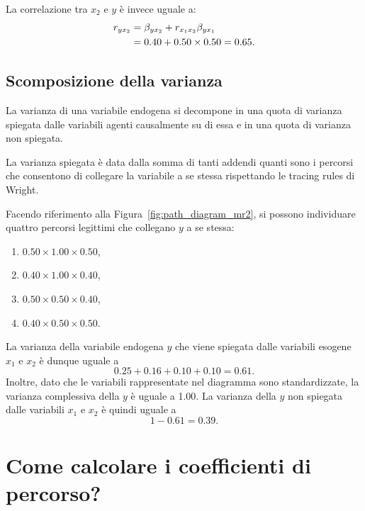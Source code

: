 La correlazione tra $x_2$ e $y$ è invece uguale a:
\begin{align}
  r_{yx_2} &=\beta_{yx_2} + r_{x_1x_2} \beta_{yx_1}\notag\\
  &= 0.40 + 0.50 \times 0.50 = 0.65.\notag
\end{align}


\subsection{Scomposizione della varianza}

La varianza di una variabile endogena si decompone in una quota
  di varianza spiegata dalle variabili agenti causalmente su di essa e
  in una quota di varianza non spiegata. 
  
\begin{defn}
  La varianza spiegata è data dalla somma di tanti addendi
  quanti sono i percorsi che consentono di collegare la
    variabile a se 
  stessa rispettando le tracing rules di Wright.  
\end{defn}

Facendo riferimento alla Figura~\ref{fig:path_diagram_mr2}, si possono
individuare quattro percorsi legittimi che collegano $y$ a se stessa:

\bigskip

  \begin{enumerate}
  \item $0.50 \times 1.00 \times 0.50$,
\item $0.40 \times 1.00 \times 0.40$,
\item $0.50 \times 0.50 \times 0.40$,
\item $0.40 \times 0.50 \times 0.50$.
  \end{enumerate}

\bigskip
\noindent
La varianza della variabile endogena $y$ che viene spiegata dalle
variabili esogene $x_1$ e $x_2$  è dunque uguale a 
$$0.25 + 0.16  + 0.10 + 0.10= 0.61.$$ 
Inoltre, dato che le variabili rappresentate nel diagramma sono  standardizzate, la varianza complessiva della $y$ è uguale a 1.00. La varianza della $y$ non spiegata dalle variabili $x_1$ e $x_2$ è quindi uguale a 
$$1-0.61 = 0.39.$$


\section{Come calcolare i coefficienti di percorso?}
\label{sec:how_compute_path_coef}


